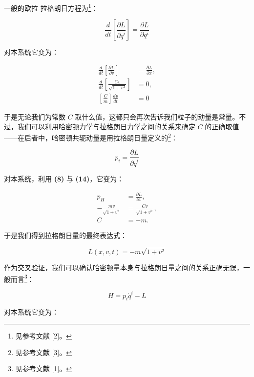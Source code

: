 一般的欧拉-拉格朗日方程为\footnote{见参考文献 [2]。}：

\begin{equation}
\frac{d}{dt}\left[\frac{\partial L}{\partial \dot{q}^{i}}\right] = \frac{\partial L}{\partial q^{i}} \tag{15}
\end{equation}

对本系统它变为：

\begin{equation}
\begin{aligned}
\frac{d}{dt}\left[\frac{\partial L}{\partial v}\right] &= \frac{\partial L}{\partial x},\\
\frac{d}{dt}\left[\frac{Cv}{\sqrt{1+v^{2}}}\right] &= 0,\\
\left[\frac{C}{m}\right]\frac{dp}{dt} &= 0
\end{aligned}
\tag{16}
\end{equation}

于是无论我们为常数 $C$ 取什么值，这都只会再次告诉我们粒子的动量是常量。不过，我们可以利用哈密顿力学与拉格朗日力学之间的关系来确定 $C$ 的正确取值——在后者中，哈密顿共轭动量是用拉格朗日量定义的\footnote{见参考文献 [3]。}：

\begin{equation}
p_{i} = \frac{\partial L}{\partial \dot{q}^{i}} \tag{17}
\end{equation}

对本系统，利用 \textbf{(8)} 与 \textbf{(14)}，它变为：

\begin{equation}
\begin{aligned}
p_{H} &= \frac{\partial L}{\partial v},\\
-\frac{mv}{\sqrt{1+v^{2}}} &= \frac{Cv}{\sqrt{1+v^{2}}},\\
C &= -m.
\end{aligned}
\end{equation}

于是我们得到拉格朗日量的最终表达式：

\begin{equation}
L(x,v,t) = -m\sqrt{1+v^{2}} \tag{18}
\end{equation}

作为交叉验证，我们可以确认哈密顿量本身与拉格朗日量之间的关系正确无误，一般而言\footnote{见参考文献 [1]。}：

\begin{equation}
H = p_{i}\dot{q}^{i} - L \tag{19}
\end{equation}

对本系统它变为：

